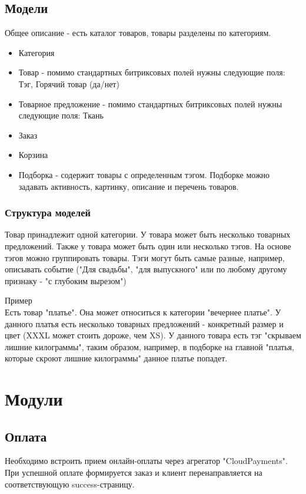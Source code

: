 \documentclass[DIV=calc, paper=a4, fontsize=11pt]{scrartcl} %
\begin{document}
\subsection{Модели}
Общее описание - есть каталог товаров, товары разделены по категориям.

\begin{itemize}
	\item Категория
	\item Товар - помимо стандартных битриксовых полей нужны следующие поля: Тэг, Горячий товар (да/нет)
	\item Товарное предложение - помимо стандартных битриксовых полей нужны следующие поля: Ткань
	\item Заказ
	\item Корзина
	\item Подборка - содержит товары с определенным тэгом. Подборке можно задавать активность, картинку, описание и перечень товаров.
\end{itemize}

\subsubsection{Структура моделей}

Товар принадлежит одной категории. У товара может быть несколько товарных предложений. Также у товара может быть один или несколько тэгов. На основе тэгов можно группировать товары. Тэги могут быть самые разные, например, описывать событие ("Для свадьбы", "для выпускного" или по любому другому признаку - "с глубоким вырезом")
\begin{framed}
Пример
\\[0.5cm]
Есть товар "платье". Она может относиться к категории "вечернее платье". У данного платья есть несколько товарных предложений - конкретный размер и цвет (XXXL может стоить дороже, чем XS). У данного товара есть тэг "скрываем лишние килограммы", таким образом, например, в подборке на главной "платья, которые скроют лишние килограммы" данное платье попадет.
\end{framed}


\section{Модули}

\subsection{Оплата}
Необходимо встроить прием онлайн-оплаты через агрегатор "CloudPayments". При успешной оплате формируется заказ и клиент перенаправляется на соответствующую success-страницу.
\end{document}
